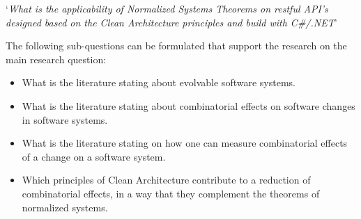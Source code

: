 \begin{center}
    \enquote*{\textit{What is the applicability of Normalized Systems Theorems
    on restful API's designed based on the Clean Architecture principles and build with
    C\#/.NET}}
\end{center}

The following sub-questions can be formulated that support the research on the main
research question:
\begin{itemize}
    \item What is the literature stating about evolvable software systems.
    \item What is the literature stating about combinatorial effects on software changes in software systems.
    \item What is the literature stating on how one can measure combinatorial effects of a change on a software system.
    \item Which principles of Clean Architecture contribute to a reduction of
    combinatorial effects, in a way that they complement the theorems of normalized
    systems.
\end{itemize}